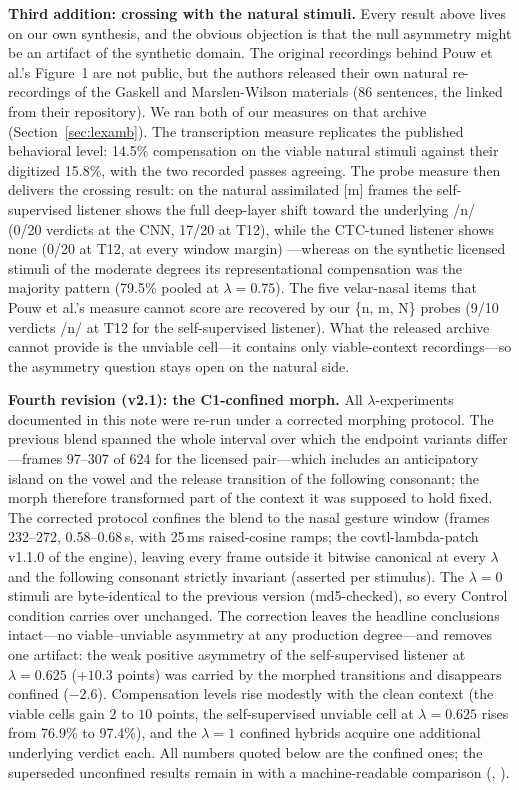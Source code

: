 \documentclass[11pt,a4paper]{article}
\newcommand{\lam}{\lambda}
\begin{document}
\medskip\noindent
\textbf{Third addition: crossing with the natural stimuli.} Every
result above lives on our own synthesis, and the obvious objection
is that the null asymmetry might be an artifact of the synthetic
domain. The original \citet{darcy2009} recordings behind Pouw et
al.'s Figure~1 are not public, but the authors released their own
natural re-recordings of the Gaskell and Marslen-Wilson materials
(86 sentences, the  linked from their
repository). We ran both of our measures on that archive
(Section~\ref{sec:lexamb}). The transcription measure replicates
the published behavioral level: 14.5\% compensation on the viable
natural stimuli against their digitized 15.8\%, with the two
recorded passes agreeing. The probe measure then delivers the
crossing result: on the natural assimilated [m] frames the
self-supervised listener shows the full deep-layer shift toward the
underlying /n/ (0/20 verdicts at the CNN, 17/20 at T12), while the
CTC-tuned listener shows none (0/20 at T12, at every window margin)
---whereas on the synthetic licensed stimuli of the moderate
degrees its representational compensation was the majority pattern
(79.5\% pooled at $\lam=0.75$). The five velar-nasal items that Pouw
et al.'s
measure cannot score are recovered by our \{n, m, N\} probes (9/10
verdicts /n/ at T12 for the self-supervised listener). What the
released archive cannot provide is the unviable cell---it contains
only viable-context recordings---so the asymmetry question stays
open on the natural side.

\medskip\noindent
\textbf{Fourth revision (v2.1): the C1-confined morph.} All
$\lam$-experiments documented in this note were re-run under a
corrected morphing protocol. The previous blend spanned the whole
interval over which the endpoint variants differ---frames 97--307 of
624 for the licensed pair---which includes an anticipatory island on
the vowel and the release transition of the following consonant; the
morph therefore transformed part of the context it was supposed to
hold fixed. The corrected protocol confines the blend to the nasal
gesture window (frames 232--272, 0.58--0.68\,s, with 25\,ms
raised-cosine ramps; the covtl-lambda-patch v1.1.0 of the engine),
leaving every frame outside it bitwise canonical at every $\lam$ and
the following consonant strictly invariant (asserted per stimulus).
The $\lam=0$ stimuli are byte-identical to the previous version
(md5-checked), so every Control condition carries over unchanged. The
correction leaves the headline conclusions intact---no
viable--unviable asymmetry at any production degree---and removes one
artifact: the weak positive asymmetry of the self-supervised listener
at $\lam=0.625$ ($+10.3$ points) was carried by the morphed
transitions and disappears confined ($-2.6$). Compensation levels rise
modestly with the clean context (the viable cells gain $2$ to $10$
points, the self-supervised unviable cell at $\lam=0.625$ rises from
76.9\% to 97.4\%), and the $\lam=1$ confined hybrids acquire one
additional underlying verdict each. All numbers quoted below are the
confined ones; the superseded unconfined results remain in
 with a machine-readable comparison
(,
).
\end{document}
